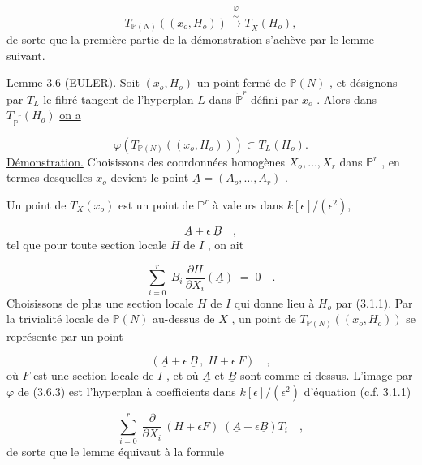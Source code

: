 \begin{equation}\tag{3.5.4}
T_{\mathbb{P}(N)}((x_o,H_o)) \overset{\varphi}{\overset{\sim}{\longrightarrow}} T_{\check{X}} (H_o) ,
\end{equation}
de sorte que la première partie de la démonstration s'achève par le lemme suivant.

\underline{Lemme} 3.6 (EULER). \underline{Soit} $(x_o, H_o)$ \underline{un point fermé de} $\mathbb{P}(N)$ , \underline{et} \underline{désignons par} $T_L$ \underline{le fibré tangent de l'hyperplan} $L$ \underline{dans} $\check{\mathbb{P}}^r$ \underline{défini par} $x_o$ . \underline{Alors dans} $T_{\check{\mathbb{P}}^r}(H_o)$ \underline{on a}

\begin{equation*}
\varphi (T_{\mathbb{P}(N)}((x_o, H_o))) \subset T_L(H_o) .
\end{equation*}
\underline{Démonstration.} Choisissons des coordonnées homogènes $X_o,\ldots,X_r$ dans $\mathbb{P}^r$ , en termes desquelles $x_o$ devient le point $\underline{A} = (A_o,\ldots,A_r)$ .



Un point de $T_X(x_o)$ est un point de $\mathbb{P}^r$ à valeurs dans $k[\epsilon]/(\epsilon^2)$,

\begin{equation}\tag{3.6.1}
\underline{A} + \epsilon \, \underline{B} \quad ,
\end{equation}
tel que pour toute section locale $H$ de $I$ , on ait

\begin{equation}\tag{3.6.2}
\sum_{i=0}^{r} \; B_i \, \frac{\partial H}{\partial X_i}(\underline{A}) \;=\; 0 \quad .
\end{equation}
Choisissons de plus une section locale $H$ de $I$ qui donne lieu à $H_o$ par (3.1.1). Par la trivialité locale de $\mathbb{P}(N)$ au-dessus de $X$ , un point de $T_{\mathbb{P}(N)}((x_o,H_o))$ se représente par un point

\begin{equation}\tag{3.6.3}
(\underline{A} + \epsilon \, \underline{B} \, , \; H + \epsilon \, F) \quad ,
\end{equation}
où $F$ est une section locale de $I$ , et où $\underline{A}$ et $\underline{B}$ sont comme ci-dessus. L'image par $\varphi$ de (3.6.3) est l'hyperplan à coefficients dans $k[\epsilon]/(\epsilon^2)$ d'équation (c.f. 3.1.1)

\begin{equation}\tag{3.6.4}
\sum_{i=0}^{r} \; \frac{\partial}{\partial X_i} \, (H+\epsilon F) \; (\underline{A}+\epsilon\underline{B})T_i \quad ,
\end{equation}
de sorte que le lemme équivaut à la formule

